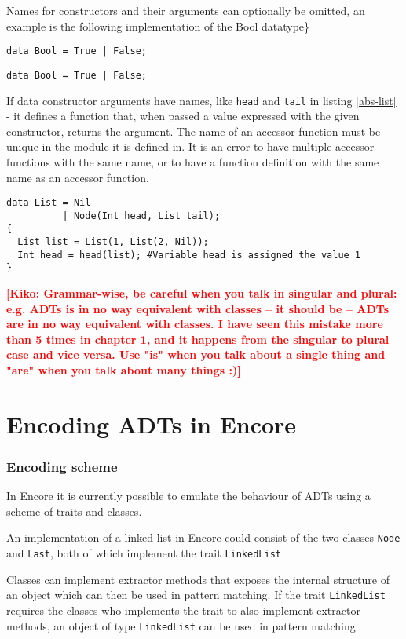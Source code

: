 \documentclass[10pt]{report}
\newcommand{\KIKO}[1]{\textcolor{red}{\textbf{[Kiko: #1]}}}
\def\code#1{\texttt{#1}} %
\begin{document}
\par{Names for constructors and their arguments can optionally be omitted, an example is the following implementation of the Bool datatype\}

\begin{lstlisting}[language=encore,caption={Actual definition of built-in type Bool},label=test-kiko]
data Bool = True | False;
\end{lstlisting}

\begin{lstlisting}[language=encore,caption={Actual definition of built-in type Bool}]
data Bool = True | False;
\end{lstlisting}
\par{If data constructor arguments have names, like \code{head} and \code{tail} in listing \ref{abs-list} - it defines a function that, when passed a value expressed with the given constructor, returns the argument.  The name of an accessor function must be unique in the module it is defined in. It is an error to have multiple accessor functions with the same name, or to have a function definition with the same name as an accessor function.}

\begin{lstlisting}[language=encore,caption={Accessor funtion in ABS},label=abs-list]
data List = Nil
          | Node(Int head, List tail);
{
  List list = List(1, List(2, Nil));
  Int head = head(list); #Variable head is assigned the value 1
}
\end{lstlisting}


\KIKO{Grammar-wise, be careful when you talk in singular and plural: e.g. ADTs is in no way equivalent with classes -- it should be -- ADTs are in no way equivalent with classes. I have seen this mistake more than
5 times in chapter 1, and it happens from the singular to plural case and vice versa. Use "is" when you talk about a single thing and "are" when you talk about many things :)}

\chapter{Encoding ADTs in Encore}
\subsection{Encoding scheme}
\par{In Encore it is currently possible to emulate the behaviour of ADTs using a scheme of traits and classes.}\cite{gustavL}%
\par{An implementation of a linked list in Encore could consist of the two classes \code{Node} and \code{Last}, both of which implement the trait \code{LinkedList}}
\par{Classes can implement extractor methods that exposes the internal structure of an object which can then be used in pattern matching. If the trait \code{LinkedList} requires the classes who implements the trait to also implement extractor methods, an object of type \code{LinkedList} can be used in pattern matching}

}
\end{document}
